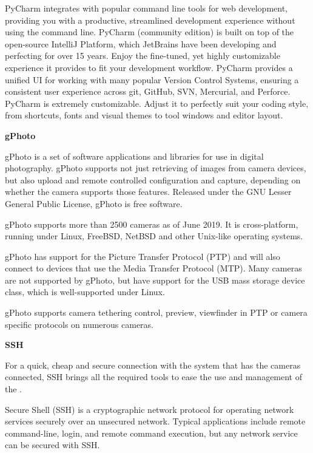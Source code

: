 PyCharm integrates with popular command line tools for web development, providing you with a productive, streamlined development experience without using the command line. PyCharm (community edition) is built on top of the open-source IntelliJ Platform, which JetBrains have been developing and perfecting for over 15 years. Enjoy the fine-tuned, yet highly customizable experience it provides to fit your development workflow. PyCharm provides a unified UI for working with many popular Version Control Systems, ensuring a consistent user experience across git, GitHub, SVN, Mercurial, and Perforce. PyCharm is extremely customizable. Adjust it to perfectly suit your coding style, from shortcuts, fonts and visual themes to tool windows and editor layout. \cite{pycharm}\vspace{0.3cm}

\textbf{gPhoto}

gPhoto is a set of software applications and libraries for use in digital photography. gPhoto supports not just retrieving of images from camera devices, but also upload and remote controlled configuration and capture, depending on whether the camera supports those features. Released under the GNU Lesser General Public License, gPhoto is free software.

gPhoto supports more than 2500 cameras as of June 2019. It is cross-platform, running under Linux, FreeBSD, NetBSD and other Unix-like operating systems.

gPhoto has support for the Picture Transfer Protocol (PTP) and will also connect to devices that use the Media Transfer Protocol (MTP). Many cameras are not supported by gPhoto, but have support for the USB mass storage device class, which is well-supported under Linux.

gPhoto supports camera tethering control, preview, viewfinder in PTP or camera specific protocols on numerous cameras. \cite{gPhoto}

\vspace{0.3cm}
\textbf{SSH}

For a quick, cheap and secure connection with the system that has the cameras connected, SSH brings all the required tools to ease the use and management of the \ThesisTitle.

Secure Shell (SSH) is a cryptographic network protocol for operating network services securely over an unsecured network. Typical applications include remote command-line, login, and remote command execution, but any network service can be secured with SSH.

